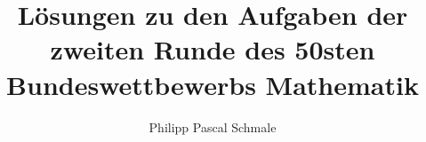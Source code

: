 \documentclass{article}
\author{Philipp Pascal Schmale}
\title{Lösungen zu den Aufgaben der zweiten Runde des 50sten Bundeswettbewerbs Mathematik}
\begin{document}
\maketitle

\tableofcontents

\pagebreak


\pagebreak


\pagebreak


\pagebreak


\pagebreak

\end{document}
